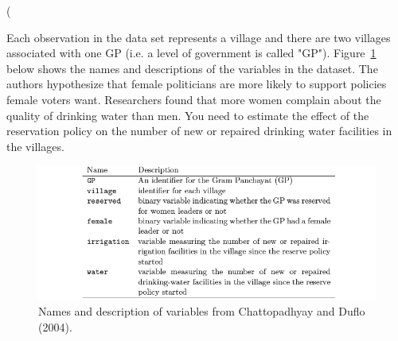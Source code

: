 \left( \documentclass[12pt,letterpaper]{article}
\begin{document}
\noindent Each observation in the data set represents a village and there are two villages associated with one GP (i.e. a level of government is called "GP"). Figure~\ref{fig:women_desc} below shows the names and descriptions of the variables in the dataset. The authors hypothesize that female politicians are more likely to support policies female voters want. Researchers found that more women complain about the quality of drinking water than men. You need to estimate the effect of the reservation policy on the number of new or repaired drinking water facilities in the villages.
\vspace{.5cm}
\begin{figure}[h!]
	\caption{\footnotesize{Names and description of variables from Chattopadhyay and Duflo (2004).}}
	\vspace{.5cm}
	\centering
	\label{fig:women_desc}
	\includegraphics[width=1.1\textwidth]{women_desc.png}
\end{figure}		
\end{document}
